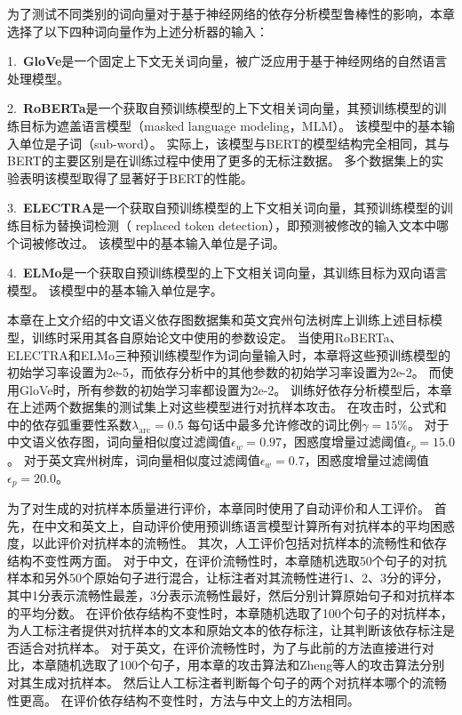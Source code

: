 为了测试不同类别的词向量对于基于神经网络的依存分析模型鲁棒性的影响，本章选择了以下四种词向量作为上述分析器的输入：

1.\ \textbf{GloVe}\cite{pennington-etal-2014-glove}是一个固定上下文无关词向量，被广泛应用于基于神经网络的自然语言处理模型。

2.\ \textbf{RoBERTa}\cite{liu-etal-2019-roberta}是一个获取自预训练模型的上下文相关词向量，其预训练模型的训练目标为遮盖语言模型（masked language modeling，MLM）。
该模型中的基本输入单位是子词（sub-word）。
实际上，该模型与BERT的模型结构完全相同，其与BERT的主要区别是在训练过程中使用了更多的无标注数据。
多个数据集上的实验表明该模型取得了显著好于BERT的性能。

3.\ \textbf{ELECTRA}\cite{clark-etal-2020-electra}是一个获取自预训练模型的上下文相关词向量，其预训练模型的训练目标为替换词检测（ replaced token detection），即预测被修改的输入文本中哪个词被修改过。
该模型中的基本输入单位是子词。

4.\ \textbf{ELMo}\cite{peters-etal-2018-deep}是一个获取自预训练模型的上下文相关词向量，其训练目标为双向语言模型。
该模型中的基本输入单位是字。

本章在上文介绍的中文语义依存图数据集和英文宾州句法树库上训练上述目标模型，训练时采用其各自原始论文中使用的参数设定。
当使用RoBERTa、ELECTRA和ELMo三种预训练模型作为词向量输入时，本章将这些预训练模型的初始学习率设置为2e-5，而依存分析中的其他参数的初始学习率设置为2e-2。
而使用GloVe时，所有参数的初始学习率都设置为2e-2。
训练好依存分析模型后，本章在上述两个数据集的测试集上对这些模型进行对抗样本攻击。
在攻击时，公式\label{eq:word-importance}和\label{eq:mis-inc}中的依存弧重要性系数$\lambda_{\text{arc}}=0.5$ 每句话中最多允许修改的词比例$\gamma=15\%$。
对于中文语义依存图，词向量相似度过滤阈值$\epsilon_w = 0.97$，困惑度增量过滤阈值$\epsilon_p = 15.0$。
对于英文宾州树库，词向量相似度过滤阈值$\epsilon_w = 0.7$，困惑度增量过滤阈值$\epsilon_p = 20.0$。

为了对生成的对抗样本质量进行评价，本章同时使用了自动评价和人工评价。
首先，在中文和英文上，自动评价使用预训练语言模型计算所有对抗样本的平均困惑度，以此评价对抗样本的流畅性。
其次，人工评价包括对抗样本的流畅性和依存结构不变性两方面。
对于中文，在评价流畅性时，本章随机选取50个句子的对抗样本和另外50个原始句子进行混合，让标注者对其流畅性进行1、2、3分的评分，其中1分表示流畅性最差，3分表示流畅性最好，然后分别计算原始句子和对抗样本的平均分数。
在评价依存结构不变性时，本章随机选取了100个句子的对抗样本，为人工标注者提供对抗样本的文本和原始文本的依存标注，让其判断该依存标注是否适合对抗样本。
对于英文，在评价流畅性时，为了与此前的方法直接进行对比，本章随机选取了100个句子，用本章的攻击算法和Zheng等人\cite{zheng-etal-2020-evaluating}的攻击算法分别对其生成对抗样本。
然后让人工标注者判断每个句子的两个对抗样本哪个的流畅性更高。
在评价依存结构不变性时，方法与中文上的方法相同。

